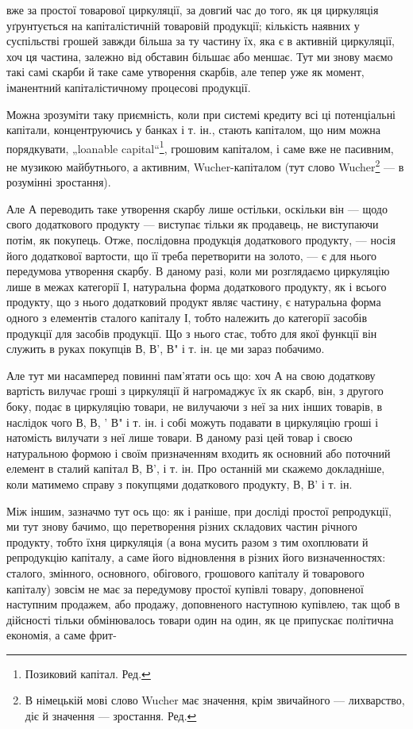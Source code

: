 вже за простої товарової циркуляції, за довгий час до того, як ця циркуляція
уґрунтується на капіталістичній товаровій продукції; кількість
наявних у суспільстві грошей завжди більша за ту частину їх, яка є
в активній циркуляції, хоч ця частина, залежно від обставин більшає
або меншає. Тут ми знову маємо такі самі скарби й таке саме утворення
скарбів, але тепер уже як момент, іманентний капіталістичному процесові
продукції.

Можна зрозуміти таку приємність, коли при системі кредиту всі ці
потенціальні капітали, концентруючись у банках і т. ін., стають капіталом,
що ним можна порядкувати, „loanable capital“\footnote*{
Позиковий капітал. Ред.
}, грошовим капіталом,
і саме вже не пасивним, не музикою майбутнього, а активним,
Wucher-капіталом (тут слово Wucher\footnote*{
В німецькій мові слово Wucher має значення, крім звичайного — лихварство,
діє й значення — зростання. Ред.
} — в розумінні зростання).

Але А переводить таке утворення скарбу лише остільки, оскільки він —
щодо свого додаткового продукту — виступає тільки як продавець, не виступаючи
потім, як покупець. Отже, послідовна продукція додаткового
продукту, — носія його додаткової вартости, що її треба перетворити
на золото, — є для нього передумова утворення скарбу. В даному разі,
коли ми розглядаємо циркуляцію лише в межах категорії І, натуральна
форма додаткового продукту, як і всього продукту, що з нього додатковий
продукт являє частину, є натуральна форма одного з елементів
сталого капіталу І, тобто належить до категорії засобів продукції для
засобів продукції. Що з нього стає, тобто для якої функції він служить
в руках покупців В, В', В" і т. ін. це ми зараз побачимо.

Але тут ми насамперед повинні пам’ятати ось що: хоч А на свою
додаткову вартість вилучає гроші з циркуляції й нагромаджує їх як
скарб, він, з другого боку, подає в циркуляцію товари, не вилучаючи
з неї за них інших товарів, в наслідок чого В, В, ' В" і т. ін. і собі
можуть подавати в циркуляцію гроші і натомість вилучати з неї лише
товари. В даному разі цей товар і своєю натуральною формою і своїм
призначенням входить як основний або поточний елемент в сталий капітал
В, В', і т. ін. Про останній ми скажемо докладніше, коли матимемо
справу з покупцями додаткового продукту, В, В' і т. ін.

Між іншим, зазначмо тут ось що: як і раніше, при досліді простої
репродукції, ми тут знову бачимо, що перетворення різних складових
частин річного продукту, тобто їхня циркуляція (а вона мусить разом
з тим охоплювати й репродукцію капіталу, а саме його відновлення
в різних його визначенностях: сталого, змінного, основного, обігового,
грошового капіталу й товарового капіталу) зовсім не має за передумову
простої купівлі товару, доповненої наступним продажем, або продажу,
доповненого наступною купівлею, так щоб в дійсності тільки обмінювалось
товари один на один, як це припускає політична економія, а саме фрит-